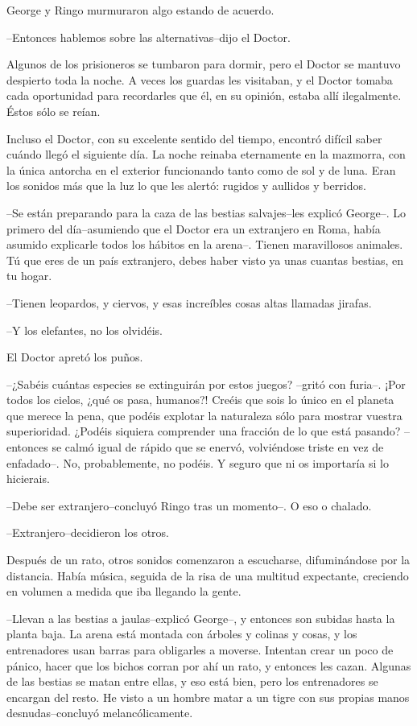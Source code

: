 George y Ringo murmuraron algo estando de acuerdo.

--Entonces hablemos sobre las alternativas--dijo el Doctor.

Algunos de los prisioneros se tumbaron para dormir, pero el Doctor se
mantuvo despierto toda la noche. A veces los guardas les visitaban, y el
Doctor tomaba cada oportunidad para recordarles que él, en su opinión,
estaba allí ilegalmente. Éstos sólo se reían.

Incluso el Doctor, con su excelente sentido del tiempo, encontró difícil
saber cuándo llegó el siguiente día. La noche reinaba eternamente en la
mazmorra, con la única antorcha en el exterior funcionando tanto como de
sol y de luna. Eran los sonidos más que la luz lo que les alertó:
rugidos y aullidos y berridos.

--Se están preparando para la caza de las bestias salvajes--les explicó
George--. Lo primero del día--asumiendo que el Doctor era un extranjero
en Roma, había asumido explicarle todos los hábitos en la arena--.
Tienen maravillosos animales. Tú que eres de un país extranjero, debes
haber visto ya unas cuantas bestias, en tu hogar.

--Tienen leopardos, y ciervos, y esas increíbles cosas altas llamadas
jirafas.

--Y los elefantes, no los olvidéis.

El Doctor apretó los puños.

--¿Sabéis cuántas especies se extinguirán por estos juegos? --gritó con
furia--. ¡Por todos los cielos, ¿qué os pasa, humanos?! Creéis que sois
lo único en el planeta que merece la pena, que podéis explotar la
naturaleza sólo para mostrar vuestra superioridad. ¿Podéis siquiera
comprender una fracción de lo que está pasando? --entonces se calmó
igual de rápido que se enervó, volviéndose triste en vez de enfadado--.
No, probablemente, no podéis. Y seguro que ni os importaría si lo
hicierais.

--Debe ser extranjero--concluyó Ringo tras un momento--. O eso o
chalado.

--Extranjero--decidieron los otros.

Después de un rato, otros sonidos comenzaron a escucharse, difuminándose
por la distancia. Había música, seguida de la risa de una multitud
expectante, creciendo en volumen a medida que iba llegando la gente.

--Llevan a las bestias a jaulas--explicó George--, y entonces son
subidas hasta la planta baja. La arena está montada con árboles y
colinas y cosas, y los entrenadores usan barras para obligarles a
moverse. Intentan crear un poco de pánico, hacer que los bichos corran
por ahí un rato, y entonces les cazan. Algunas de las bestias se matan
entre ellas, y eso está bien, pero los entrenadores se encargan del
resto. He visto a un hombre matar a un tigre con sus propias manos
desnudas--concluyó melancólicamente.

